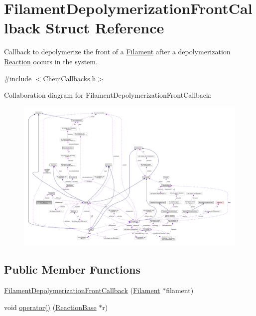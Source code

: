 \hypertarget{structFilamentDepolymerizationFrontCallback}{\section{Filament\+Depolymerization\+Front\+Callback Struct Reference}
\label{structFilamentDepolymerizationFrontCallback}
}


Callback to depolymerize the front of a \hyperlink{classFilament}{Filament} after a depolymerization \hyperlink{classReaction}{Reaction} occurs in the system.  




{\ttfamily \#include $<$Chem\+Callbacks.\+h$>$}



Collaboration diagram for Filament\+Depolymerization\+Front\+Callback\+:
\nopagebreak
\begin{figure}[H]
\begin{center}
\leavevmode
\includegraphics[width=350pt]{structFilamentDepolymerizationFrontCallback__coll__graph}
\end{center}
\end{figure}
\subsection*{Public Member Functions}
\begin{DoxyCompactItemize}
\item 
\hyperlink{structFilamentDepolymerizationFrontCallback_ae557d44570cb2ce569ab93c97a6f860c}{Filament\+Depolymerization\+Front\+Callback} (\hyperlink{classFilament}{Filament} $\ast$filament)
\item 
void \hyperlink{structFilamentDepolymerizationFrontCallback_a741d68a920eb8dde3ebc0c94529bbd8a}{operator()} (\hyperlink{classReactionBase}{Reaction\+Base} $\ast$r)
\end{DoxyCompactItemize}
